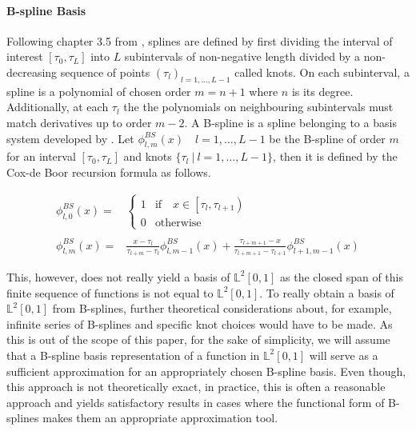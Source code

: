 \documentclass[11pt,twoside,a4paper]{article}
\begin{document}
	\paragraph{B-spline Basis} Following chapter 3.5 from \cite{ramsay_functional_2005}, splines are defined by first dividing the interval of interest $[\tau_0, \tau_L]$ into $L$ subintervals of non-negative length divided by a non-decreasing sequence of points $(\tau_l)_{l = 1,\dots, L-1}$ called knots. On each subinterval, a spline is a polynomial of chosen order $m = n+1$ where $n$ is its degree. Additionally, at each $\tau_l$ the the polynomials on neighbouring subintervals must match derivatives up to order $m-2$.
	A B-spline is a spline belonging to a basis system developed by \cite{de_boor_practical_1978}. Let $\phi_{l,m}^{BS}(x) \quad l = 1,\dots,L-1$ be the B-spline of order $m$ for an interval $[\tau_0, \tau_L]$ and knots $\{\tau_l \: \vert \: l = 1,\dots, L-1\}$, then it is defined by the Cox-de Boor recursion formula as follows. 

	\begin{equation}
		\begin{split}
			\phi_{l,0}^{BS}(x) = &
			\begin{cases}
				1 & \text{if} \quad x \in \left[\tau_l, \tau_{l+1}\right)\\
				0 & \text{otherwise}
			\end{cases}\\ \\
			\phi_{l,m}^{BS}(x) = &\frac{x - \tau_l}{\tau_{l+m} - \tau_l} \phi_{l,m-1}^{BS}(x) + \frac{\tau_{l+m+1} - x}{\tau_{l+m+1} - \tau_{l+1}} \phi_{l+1,m-1}^{BS}(x)
		\end{split}
	\end{equation}
	
	This, however, does not really yield a basis of $\mathbb{L}^2[0,1]$ as the closed span of this finite sequence of functions is not equal to $\mathbb{L}^2[0,1]$. To really obtain a basis of $\mathbb{L}^2[0,1]$ from B-splines, further theoretical considerations about, for example, infinite series of B-splines and specific knot choices would have to be made. As this is out of the scope of this paper, for the sake of simplicity, we will assume that a B-spline basis representation of a function in $\mathbb{L}^2[0,1]$ will serve as a sufficient approximation for an appropriately chosen B-spline basis. 
	Even though, this approach is not theoretically exact, in practice, this is often a reasonable approach and yields satisfactory results in cases where the functional form of B-splines makes them an appropriate approximation tool. 
	
\end{document}
